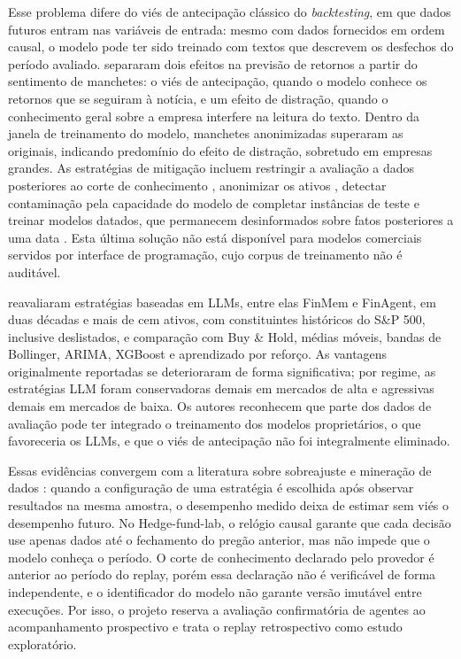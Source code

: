 \documentclass{eic-bcc-tcc}
\begin{document}
Esse problema difere do viés de antecipação clássico do \textit{backtesting}, em que dados futuros entram nas variáveis de entrada: mesmo com dados fornecidos em ordem causal, o modelo pode ter sido treinado com textos que descrevem os desfechos do período avaliado. \citet{Glasserman2023} separaram dois efeitos na previsão de retornos a partir do sentimento de manchetes: o viés de antecipação, quando o modelo conhece os retornos que se seguiram à notícia, e um efeito de distração, quando o conhecimento geral sobre a empresa interfere na leitura do texto. Dentro da janela de treinamento do modelo, manchetes anonimizadas superaram as originais, indicando predomínio do efeito de distração, sobretudo em empresas grandes. As estratégias de mitigação incluem restringir a avaliação a dados posteriores ao corte de conhecimento \citep{LopezLira2023}, anonimizar os ativos \citep{StockAgent2024, Glasserman2023}, detectar contaminação pela capacidade do modelo de completar instâncias de teste \citep{Golchin2024} e treinar modelos datados, que permanecem desinformados sobre fatos posteriores a uma data \citep{Drinkall2024}. Esta última solução não está disponível para modelos comerciais servidos por interface de programação, cujo corpus de treinamento não é auditável.

\citet{FINSABER2026} reavaliaram estratégias baseadas em LLMs, entre elas FinMem e FinAgent, em duas décadas e mais de cem ativos, com constituintes históricos do S\&P 500, inclusive deslistados, e comparação com Buy \& Hold, médias móveis, bandas de Bollinger, ARIMA, XGBoost e aprendizado por reforço. As vantagens originalmente reportadas se deterioraram de forma significativa; por regime, as estratégias LLM foram conservadoras demais em mercados de alta e agressivas demais em mercados de baixa. Os autores reconhecem que parte dos dados de avaliação pode ter integrado o treinamento dos modelos proprietários, o que favoreceria os LLMs, e que o viés de antecipação não foi integralmente eliminado.

Essas evidências convergem com a literatura sobre sobreajuste e mineração de dados \citep{White2000, Hansen2005, Bailey2017}: quando a configuração de uma estratégia é escolhida após observar resultados na mesma amostra, o desempenho medido deixa de estimar sem viés o desempenho futuro. No Hedge-fund-lab, o relógio causal garante que cada decisão use apenas dados até o fechamento do pregão anterior, mas não impede que o modelo conheça o período. O corte de conhecimento declarado pelo provedor é anterior ao período do replay, porém essa declaração não é verificável de forma independente, e o identificador do modelo não garante versão imutável entre execuções. Por isso, o projeto reserva a avaliação confirmatória de agentes ao acompanhamento prospectivo e trata o replay retrospectivo como estudo exploratório.
\end{document}
